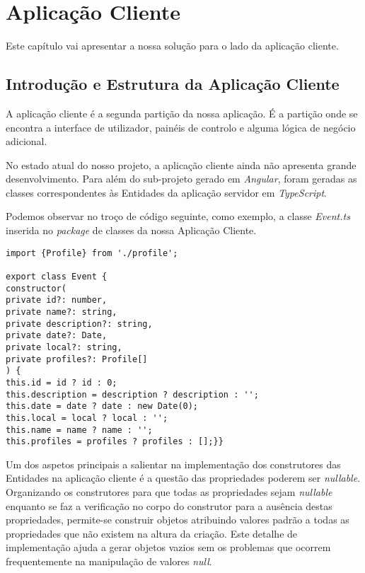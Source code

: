 %

\chapter{Aplicação Cliente} \label{cliente}

Este capítulo vai apresentar a nossa solução para o lado da aplicação cliente.

\section{Introdução e Estrutura da Aplicação Cliente} \label{sec41}
A aplicação cliente é a segunda partição da nossa aplicação. É a partição onde se encontra a interface de utilizador, painéis de controlo e alguma lógica de negócio adicional.

No estado atual do nosso projeto, a aplicação cliente ainda não apresenta grande desenvolvimento. Para além do sub-projeto gerado em \emph{Angular}, foram geradas as classes correspondentes às Entidades da aplicação servidor em \emph{TypeScript}.

Podemos observar no troço de código seguinte, como exemplo, a classe \emph{Event.ts} inserida no \emph{package} de classes da nossa Aplicação Cliente.

\begin{verbatim}
import {Profile} from './profile';

export class Event {
constructor(
private id?: number,
private name?: string,
private description?: string,
private date?: Date,
private local?: string,
private profiles?: Profile[]
) {
this.id = id ? id : 0;
this.description = description ? description : '';
this.date = date ? date : new Date(0);
this.local = local ? local : '';
this.name = name ? name : '';
this.profiles = profiles ? profiles : [];}}
\end{verbatim}

Um dos aspetos principais a salientar na implementação dos construtores das Entidades na aplicação cliente é a questão das propriedades poderem ser \emph{nullable}. Organizando os construtores para que todas as propriedades sejam \emph{nullable} enquanto se faz a verificação no corpo do construtor para a ausência destas propriedades, permite-se construir objetos atribuindo valores padrão a todas as propriedades que não existem na altura da criação. Este detalhe de implementação ajuda a gerar objetos vazios sem os problemas que ocorrem frequentemente na manipulação de valores \emph{null}.